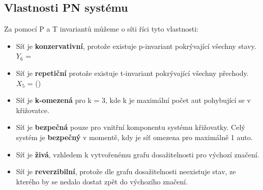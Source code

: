 \newpage
\subsection*{Vlastnosti PN systému}
\label{subsec:pn_properties}

Za pomocí P a T invariantů můžeme o síti říci tyto vlastnosti:

\begin{itemize}
    \item Síť je \textbf{konzervativní}, protože existuje p-invariant pokrývající všechny stavy. \\ $Y_6$ = \orderArrayNumbered{\pAll}
    \item Síť je \textbf{ repetiční} protože existuje t-invariant pokrývající všechny přechody. \\ $X_5$ = (\tAll)
    \item Síť je \textbf{k-omezená} pro k = 3, kde k je maximální počet aut pohybující se v křižovatce.
    \item {
        Síť je \textbf{bezpečná} pouze pro vnitřní komponentu systému křižovatky.
        Celý systém je \textbf{bezpečný} v momentě, kdy je síť omezena pro maximálně 1 auto.
    }
    \item Síť je \textbf{živá}, vzhledem k vytvořenému grafu dosažitelnosti pro výchozí značení.
    \item Síť je \textbf{reverzibilní}, protože dle grafu dosažitelnosti neexistuje stav, ze kterého by se nedalo dostat zpět do výchozího značení.
\end{itemize}

\endinput